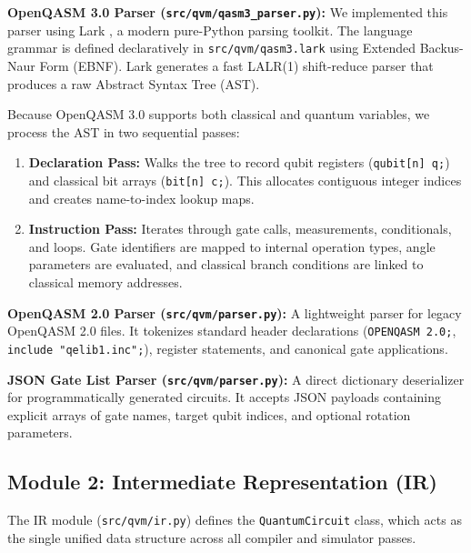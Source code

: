 \textbf{OpenQASM 3.0 Parser (\texttt{src/qvm/qasm3\_parser.py}):}
We implemented this parser using Lark \cite{lark2023}, a modern pure-Python parsing toolkit. The language grammar is defined declaratively in \texttt{src/qvm/qasm3.lark} using Extended Backus-Naur Form (EBNF). Lark generates a fast LALR(1) shift-reduce parser that produces a raw Abstract Syntax Tree (AST). 

Because OpenQASM 3.0 supports both classical and quantum variables, we process the AST in two sequential passes:
\begin{enumerate}[leftmargin=*]
    \item \textbf{Declaration Pass:} Walks the tree to record qubit registers (\texttt{qubit[n] q;}) and classical bit arrays (\texttt{bit[n] c;}). This allocates contiguous integer indices and creates name-to-index lookup maps.
    \item \textbf{Instruction Pass:} Iterates through gate calls, measurements, conditionals, and loops. Gate identifiers are mapped to internal operation types, angle parameters are evaluated, and classical branch conditions are linked to classical memory addresses.
\end{enumerate}

\textbf{OpenQASM 2.0 Parser (\texttt{src/qvm/parser.py}):}
A lightweight parser for legacy OpenQASM 2.0 files. It tokenizes standard header declarations (\texttt{OPENQASM 2.0;}, \texttt{include "qelib1.inc";}), register statements, and canonical gate applications.

\textbf{JSON Gate List Parser (\texttt{src/qvm/parser.py}):}
A direct dictionary deserializer for programmatically generated circuits. It accepts JSON payloads containing explicit arrays of gate names, target qubit indices, and optional rotation parameters.

\subsection{Module 2: Intermediate Representation (IR)}
The IR module (\texttt{src/qvm/ir.py}) defines the \texttt{QuantumCircuit} class, which acts as the single unified data structure across all compiler and simulator passes.

